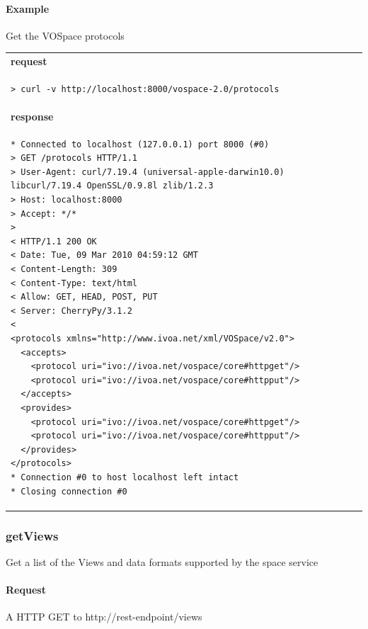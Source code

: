 \documentclass[11pt,a4paper]{ivoa}
\begin{document}
\paragraph{Example}
Get the VOSpace protocols

\begin{tabular}{ p{10cm} }
\\
\textbf{request} \\
\begin{lstlisting}
> curl -v http://localhost:8000/vospace-2.0/protocols
\end{lstlisting} \\
\textbf{response} \\
\begin{lstlisting}
* Connected to localhost (127.0.0.1) port 8000 (#0)
> GET /protocols HTTP/1.1
> User-Agent: curl/7.19.4 (universal-apple-darwin10.0) libcurl/7.19.4 OpenSSL/0.9.8l zlib/1.2.3
> Host: localhost:8000
> Accept: */*
> 
< HTTP/1.1 200 OK
< Date: Tue, 09 Mar 2010 04:59:12 GMT
< Content-Length: 309
< Content-Type: text/html
< Allow: GET, HEAD, POST, PUT
< Server: CherryPy/3.1.2
< 
<protocols xmlns="http://www.ivoa.net/xml/VOSpace/v2.0">
  <accepts>
    <protocol uri="ivo://ivoa.net/vospace/core#httpget"/>
    <protocol uri="ivo://ivoa.net/vospace/core#httpput"/>
  </accepts>
  <provides>
    <protocol uri="ivo://ivoa.net/vospace/core#httpget"/>
    <protocol uri="ivo://ivoa.net/vospace/core#httpput"/>
  </provides>
</protocols>
* Connection #0 to host localhost left intact
* Closing connection #0
\end{lstlisting}
\end{tabular}

\subsubsection{getViews}
Get a list of the Views and data formats supported by the space service

\paragraph{Request}
A HTTP GET to http://rest-endpoint/views
\end{document}
